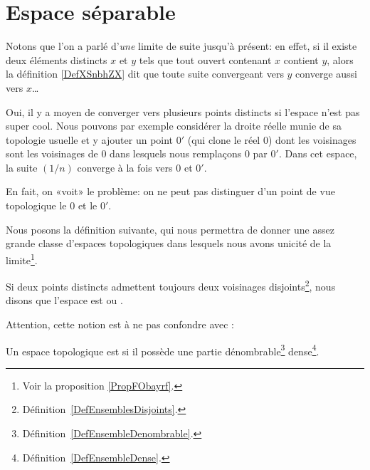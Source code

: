 \section{Espace séparable}

Notons que l'on a parlé d'\emph{une} limite de suite jusqu'à présent: en effet, si il existe deux éléments distincts \( x\) et \( y\) tels que tout ouvert contenant \( x\) contient \( y\), alors la définition \ref{DefXSnbhZX} dit que toute suite convergeant vers \( y\) converge aussi vers \( x\)\dots


\begin{example} \label{EXooSHKAooZQEVLB}
	Oui, il y a moyen de converger vers plusieurs points distincts si l'espace n'est pas super cool. Nous pouvons par exemple \cite{EJVQuas} considérer la droite réelle munie de sa topologie usuelle et y ajouter un point \( 0'\) (qui clone le réel \( 0\)) dont les voisinages sont les voisinages de \( 0\) dans lesquels nous remplaçons \( 0\) par \( 0'\). Dans cet espace, la suite \( (1/n)\) converge à la fois vers \( 0\) et \( 0'\).

	En fait, on «voit» le problème: on ne peut pas distinguer d'un point de vue topologique le \( 0\) et le \( 0'\).
\end{example}

Nous posons la définition suivante, qui nous permettra de donner une assez grande classe d'espaces topologiques dans lesquels nous avons unicité de la limite\footnote{Voir la proposition \ref{PropFObayrf}.}.

\begin{definition}  \label{DefYFmfjjm}
	Si deux points distincts admettent toujours deux voisinages disjoints\footnote{Définition~\ref{DefEnsemblesDisjoints}.}, nous disons que l'espace est  ou .
\end{definition}

Attention, cette notion est à ne pas confondre avec :
\begin{definition}  \label{DefUADooqilFK}
	Un espace topologique est  si il possède une partie dénombrable\footnote{Définition~\ref{DefEnsembleDenombrable}.} dense\footnote{Définition~\ref{DefEnsembleDense}.}.
\end{definition}

